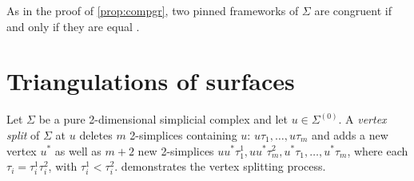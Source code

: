 \documentclass[11pt]{amsart}
\theoremstyle{definition}
\theoremstyle{remark}
\newcommand*{\defn}[1]{{\color{purple}\textit{#1}}}
\begin{document}
As in the proof of \cref{prop:compgr}, two pinned frameworks of $\Sigma$ are congruent if and only if they are equal \cite[p. 56]{southgate2024volume}.

\section{Triangulations of surfaces}\label{sec:trisurf}

Let $\Sigma$ be a pure 2-dimensional simplicial complex and let $u\in\Sigma^{(0)}$.
A \defn{vertex split} of $\Sigma$ at $u$ deletes $m$ 2-simplices containing $u$: $u\tau_1,\dots,u\tau_m$ and adds a new vertex $u^*$ as well as $m+2$ new 2-simplices $uu^*\tau_1^1, uu^*\tau_m^2,u^*\tau_1,\dots,u^*\tau_m$, where each $\tau_i=\tau_i^1\tau_i^2$, with $\tau_i^1<\tau_i^2$.
 demonstrates the vertex splitting process.
\end{document}
